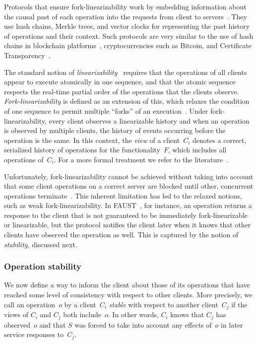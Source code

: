 \documentclass[11pt]{article}
\theoremstyle{plain-boldhead}
\theoremstyle{definition-boldhead}
\begin{document}
Protocols that ensure fork-linearizability work by embedding information
about the causal past of each operation into the requests from client to
servers~\cite{mazsha02,cacohr14,brcakn15}.  They use hash chains, Merkle
trees, and vector clocks for representing the past history of operations
and their context.  Such protocols are very similar to the use of hash
chains in blockchain platforms~\cite{bmcnkf15}, cryptocurrencies such as
Bitcoin, and Certificate Transparency~\cite{laurie14}.

The standard notion of \emph{linearizability}~\cite{herwin90} requires that
the operations of all clients appear to execute atomically in one sequence,
and that the atomic sequence respects the real-time partial order of the
operations that the clients observe.  \emph{Fork-linearizability} is
defined as an extension of this, which relaxes the condition of one
sequence to permit multiple ``forks'' of an
execution~\cite{mazsha02,cashsh07}.  Under fork-linearizability, every
client observes a linearizable history and when an operation is observed by
multiple clients, the history of events occurring before the operation is
the same.  In this context, the \emph{view} of a client~$C_i$ denotes a
correct, serialized history of operations for the functionality~$F$, which
includes all operations of~$C_i$.  For a more formal treatment we refer to
the literature~\cite{cashsh07}.

Unfortunately, fork-linearizability cannot be achieved without taking into
account that some client operations on a correct server are blocked until
other, concurrent operations terminate~\cite{cashsh07}.  This inherent
limitation has led to the relaxed notions, such as weak
fork-linearizability.  In FAUST~\cite{cakesh11}, for instance, an operation
returns a response to the client that is not guaranteed to be immediately
fork-linearizable or linearizable, but the protocol notifies the client
later when it knows that other clients have observed the operation as well.
This is captured by the notion of \emph{stability}, discussed next.


\subsubsection{Operation stability}

We now define a way to inform the client about those of its
operations that  have reached some level of consistency
with respect to other clients.
More precisely, we call an operation~$o$ by a client~$C_i$ \emph{stable}
with respect to another client~$C_j$ if the views of $C_i$ and $C_j$ both
include~$o$.  In other words, $C_i$ knows that $C_j$ has observed~$o$
and that $S$ was forced to take into account any effects of~$o$ in later
service responses to~$C_j$.  
\end{document}
